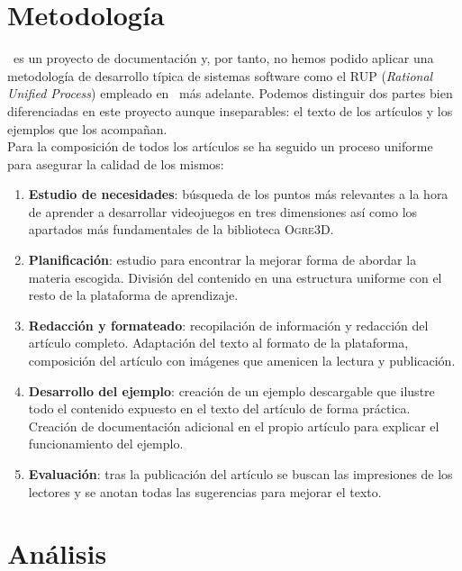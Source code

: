 \section{Metodología}

\wiki\ es un proyecto de documentación y, por tanto, no hemos podido
aplicar una metodología de desarrollo típica de sistemas software como el
RUP (\textit{Rational Unified Process}) empleado en \juego\ más adelante.
Podemos distinguir dos partes bien diferenciadas en este proyecto aunque
inseparables: el texto de los artículos y los ejemplos que los acompañan.\\

Para la composición de todos los artículos se ha seguido un proceso
uniforme para asegurar la calidad de los mismos:\\

\begin{enumerate}
    \itemsep0em
    \item \textbf{Estudio de necesidades}: búsqueda de los puntos más
    relevantes a la hora de aprender a desarrollar videojuegos en tres dimensiones
    así como los apartados más fundamentales de la biblioteca \textsc{Ogre3D}.
    \item \textbf{Planificación}: estudio para encontrar la mejorar forma
    de abordar la materia escogida. División del contenido en una
    estructura uniforme con el resto de la plataforma de aprendizaje. 
    \item \textbf{Redacción y formateado}: recopilación de información y
    redacción del artículo completo. Adaptación del texto al formato
    de la plataforma, composición del artículo con imágenes que amenicen
    la lectura y publicación.
    \item \textbf{Desarrollo del ejemplo}: creación de un ejemplo descargable
    que ilustre todo el contenido expuesto en el texto del artículo de forma
    práctica. Creación de documentación adicional en el propio artículo
    para explicar el funcionamiento del ejemplo.
    \item \textbf{Evaluación}: tras la publicación del artículo se buscan
    las impresiones de los lectores y se anotan todas las sugerencias para
    mejorar el texto.
\end{enumerate}

\section{Análisis}
\label{iberogre-analisis}

